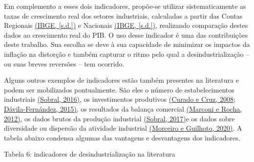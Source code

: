 Em complemento a esses dois indicadores, propõe-se utilizar
sistematicamente as taxas de crescimento real dos setores industriais,
calculadas a partir das Contas Regionais
\href{https://www.zotero.org/google-docs/?0stZtG}{(IBGE, {[}s.d.{]})} e
Nacionais \href{https://www.zotero.org/google-docs/?88Rg2R}{(IBGE,
{[}s.d.{]})}, realizando comparação destes dados ao crescimento real do
PIB. O uso desse indicador é uma das contribuições deste trabalho. Sua
escolha se deve à sua capacidade de minimizar os impactos da inflação na
distorção e também capturar o ritmo pelo qual a desindustrialização --
ou suas breves reversões -- tem ocorrido.

Alguns outros exemplos de indicadores estão também presentes na
literatura e podem ser mobilizados pontualmente. São eles o número de
estabelecimentos industriais
\href{https://www.zotero.org/google-docs/?5wGUqf}{(Sobral, 2016)}, os
investimentos produtivos
\href{https://www.zotero.org/google-docs/?340vXJ}{(Curado e Cruz, 2008;
Dávila-Fernández, 2015)}, os resultados da balança comercial
\href{https://www.zotero.org/google-docs/?bXMcor}{(Marconi e Rocha,
2012)}, os dados brutos da produção industrial
\href{https://www.zotero.org/google-docs/?dgCIq5}{(Sobral, 2017)}e os
dados sobre diversidade ou dispersão da atividade industrial
\href{https://www.zotero.org/google-docs/?rnuum2}{(Morceiro e Guilhoto,
2020)}. A tabela abaixo condensa algumas das vantagens e desvantagens
dos indicadores.

Tabela 6: indicadores de desindustrialização na literatura

